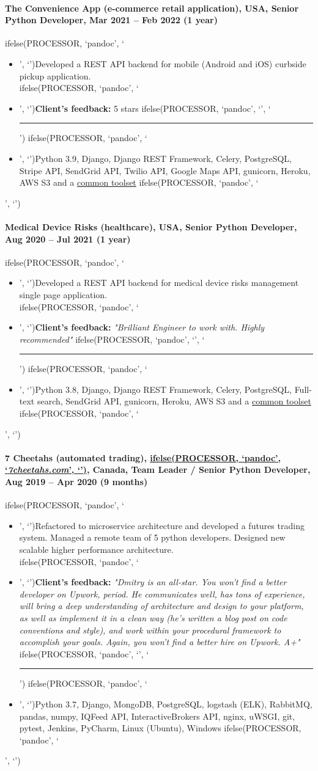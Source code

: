 \documentclass[a4paper,8pt]{extarticle}
\newcommand{\chref}[2]{\href{#1}
{ifelse(PROCESSOR, `pandoc', `#2', `\underline{\smash{#2}}')}}
\newcommand{\itchref}[2]{\chref{#1}{\textit{#2}}}  %
\newcommand{\chrule}{ifelse(PROCESSOR, `pandoc', `', `\vspace{3pt}\hrule')}
\newcommand{\pdbeginitemize}{ifelse(PROCESSOR, `pandoc', `\begin{itemize}', `')}
\newcommand{\pditem}{ifelse(PROCESSOR, `pandoc', `\item', `')}
\newcommand{\pdenditemize}{ifelse(PROCESSOR, `pandoc', `\end{itemize}', `')}
\begin{document}
\paragraph*{The Convenience App (e-commerce retail application), USA, Senior Python Developer, Mar 2021 -- Feb 2022 (1 year)}
\pdbeginitemize
\pditem Developed a REST API backend for mobile (Android and iOS) curbside pickup application.\\
\pditem \textbf{Client's feedback:} 5 stars
\chrule
\pditem Python 3.9, Django, Django REST Framework, Celery, PostgreSQL, Stripe API, SendGrid API, Twilio API, Google Maps API, gunicorn, Heroku, AWS S3 and a \hyperlink{common-toolset}{common toolset}
\pdenditemize

\paragraph*{Medical Device Risks (healthcare), USA, Senior Python Developer, Aug 2020 -- Jul 2021 (1 year)}
\pdbeginitemize
\pditem Developed a REST API backend for medical device risks management single page application.\\
\pditem \textbf{Client's feedback:} \textit{"Brilliant Engineer to work with. Highly recommended"}
\chrule
\pditem Python 3.8, Django, Django REST Framework, Celery, PostgreSQL, Full-text search, SendGrid API, gunicorn, Heroku, AWS S3 and a \hyperlink{common-toolset}{common toolset}
\pdenditemize

\paragraph*{7 Cheetahs (automated trading), \itchref{https://7cheetahs.com}{7cheetahs.com}, Canada, Team Leader / Senior Python Developer, Aug 2019 -- Apr 2020 (9 months)}
\pdbeginitemize
\pditem Refactored to microservice architecture and developed a futures trading system. Managed a remote team of 5 python developers. Designed new scalable higher performance architecture.\\
\pditem \textbf{Client's feedback:} \textit{"Dmitry is an all-star. You won't find a better developer on Upwork, period. He communicates well, has tons of experience, will bring a deep understanding of architecture and design to your platform, as well as implement it in a clean way (he's written a blog post on code conventions and style), and work within your procedural framework to accomplish your goals. Again, you won't find a better hire on Upwork. A+"}
\chrule
\pditem Python 3.7, Django, MongoDB, PostgreSQL, logstash (ELK), RabbitMQ, pandas, numpy, IQFeed API, InteractiveBrokers API, nginx, uWSGI, git, pytest, Jenkins, PyCharm, Linux (Ubuntu), Windows
\pdenditemize
\end{document}
